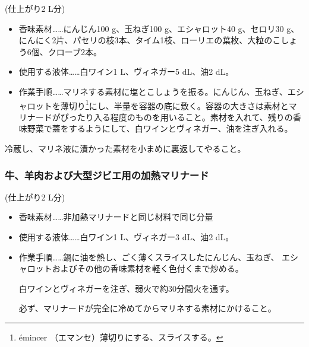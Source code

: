 \begin{recette}
(仕上がり2 L分)

\begin{itemize}
\item
  香味素材\ldots{}\ldots{}にんじん100 g、玉ねぎ100 g、エシャロット40
  g、セロリ30
  g、にんにく2片、パセリの枝3本、タイム1枝、ローリエの葉\undemi{}枚、大粒のこしょう6個、クローブ2本。
\item
  使用する液体\ldots{}\ldots{}白ワイン1\unquart{} L、ヴィネガー5
  dL、油2\undemi{} dL。
\item
  作業手順\ldots{}\ldots{}マリネする素材に塩とこしょうを振る。にんじん、玉ねぎ、エシャロットを薄切り\footnote{émincer
    （エマンセ）薄切りにする、スライスする。}にし、半量を容器の底に敷く。容器の大きさは素材とマリナードがぴったり入る程度のものを用いること。素材を入れて、残りの香味野菜で蓋をするようにして、白ワインとヴィネガー、油を注ぎ入れる。
\end{itemize}

冷蔵し、マリネ液に漬かった素材を小まめに裏返してやること。

\hypertarget{marinade-cuite-pour-viandes-de-boucherie-ou-venaison}{%
\subsubsection{牛、羊肉および大型ジビエ用の加熱マリナード}\label{marinade-cuite-pour-viandes-de-boucherie-ou-venaison}}



(仕上がり2 L分)

\begin{itemize}
\item
  香味素材\ldots{}\ldots{}非加熱マリナードと同じ材料で同じ分量
\item
  使用する液体\ldots{}\ldots{}白ワイン1\undemi{} L、ヴィネガー3
  dL、油2\undemi{} dL。
\item
  作業手順\ldots{}\ldots{}鍋に油を熱し、ごく薄くスライスしたにんじん、玉ねぎ、
  エシャロットおよびその他の香味素材を軽く色付くまで炒める。

  白ワインとヴィネガーを注ぎ、弱火で約30分間火を通す。

  必ず、マリナードが完全に冷めてからマリネする素材にかけること。
\end{itemize}


\end{recette}
